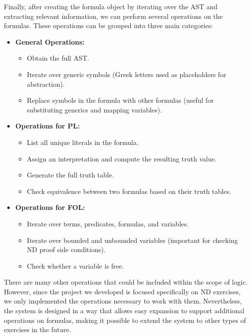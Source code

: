 Finally, after creating the formula object by iterating over the \gls{AST} and extracting relevant information, we can perform several operations on the formulas. These operations can be grouped into three main categories:

\begin{itemize}
    \setlength{\itemsep}{5pt}
    \item \textbf{General Operations:} 
    \begin{itemize}[noitemsep, topsep=0pt]
        \item Obtain the full \gls{AST}.
        \item Iterate over generic symbols (Greek letters used as placeholders for abstraction).
        \item Replace symbols in the formula with other formulas (useful for substituting generics and mapping variables).
    \end{itemize}

    \item \textbf{Operations for \gls{PL}:}
    \begin{itemize}[noitemsep, topsep=0pt]
        \item List all unique literals in the formula.
        \item Assign an interpretation and compute the resulting truth value.
        \item Generate the full truth table.
        \item Check equivalence between two formulas based on their truth tables.
    \end{itemize}

    \item \textbf{Operations for \gls{FOL}:}
    \begin{itemize}[noitemsep, topsep=0pt]
        \item Iterate over terms, predicates, formulas, and variables.
        \item Iterate over bounded and unbounded variables (important for checking \gls{ND} proof side conditions).
        \item Check whether a variable is free.
    \end{itemize}
\end{itemize}

There are many other operations that could be included within the scope of logic. However, since the project we developed is focused specifically on \gls{ND} exercises, we only implemented the operations necessary to work with them. Nevertheless, the system is designed in a way that allows easy expansion to support additional operations on formulas, making it possible to extend the system to other types of exercises in the future.

